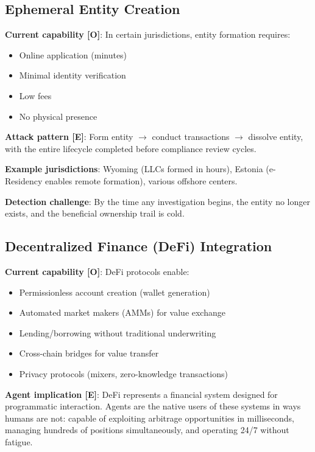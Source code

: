 \documentclass[11pt,letterpaper]{article}
\begin{document}
\subsection{Ephemeral Entity Creation}

\textbf{Current capability [O]}: In certain jurisdictions, entity formation requires:
\begin{itemize}
  \item Online application (minutes)
  \item Minimal identity verification
  \item Low fees
  \item No physical presence
\end{itemize}

\textbf{Attack pattern [E]}: Form entity $\rightarrow$ conduct transactions $\rightarrow$ dissolve entity, with the entire lifecycle completed before compliance review cycles.

\textbf{Example jurisdictions}: Wyoming (LLCs formed in hours), Estonia (e-Residency enables remote formation), various offshore centers.

\textbf{Detection challenge}: By the time any investigation begins, the entity no longer exists, and the beneficial ownership trail is cold.

\subsection{Decentralized Finance (DeFi) Integration}

\textbf{Current capability [O]}: DeFi protocols enable:
\begin{itemize}
  \item Permissionless account creation (wallet generation)
  \item Automated market makers (AMMs) for value exchange
  \item Lending/borrowing without traditional underwriting
  \item Cross-chain bridges for value transfer
  \item Privacy protocols (mixers, zero-knowledge transactions)
\end{itemize}

\textbf{Agent implication [E]}: DeFi represents a financial system designed for programmatic interaction. Agents are the native users of these systems in ways humans are not: capable of exploiting arbitrage opportunities in milliseconds, managing hundreds of positions simultaneously, and operating 24/7 without fatigue.
\end{document}

